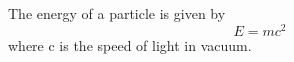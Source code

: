 \documentclass{article}
\begin{document}
The energy of a particle is given by
\[ E = mc^2 \]
where c is the speed of light in vacuum.
\end{document}

